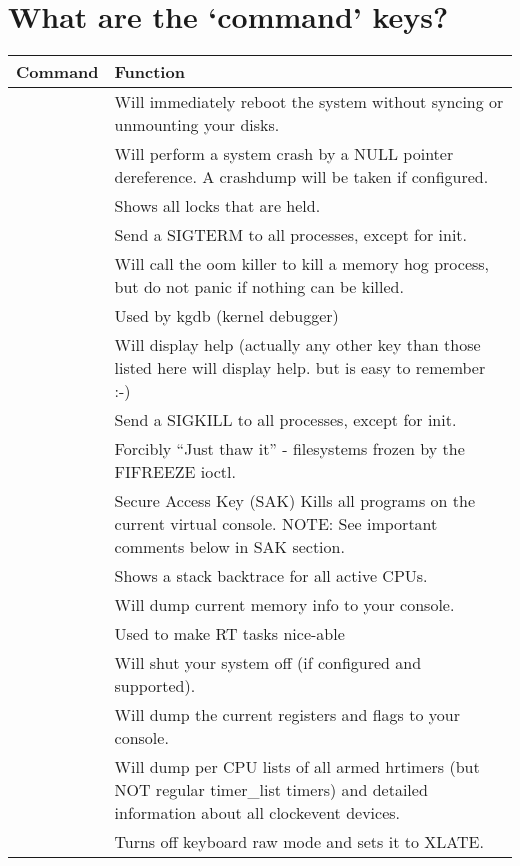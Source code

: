 \documentclass[a4paper,8pt,english]{sphinxmanual}
\begin{document}
\section{What are the `command' keys?}
\label{admin-guide/sysrq:what-are-the-command-keys}
\begin{tabulary}{\linewidth}{|L|L|}
\hline
\textsf{\relax 
Command
} & \textsf{\relax 
Function
}\\
\hline
{}
 & 
Will immediately reboot the system without syncing or unmounting
your disks.
\\
\hline
{}
 & 
Will perform a system crash by a NULL pointer dereference.
A crashdump will be taken if configured.
\\
\hline
{}
 & 
Shows all locks that are held.
\\
\hline
{}
 & 
Send a SIGTERM to all processes, except for init.
\\
\hline
{}
 & 
Will call the oom killer to kill a memory hog process, but do not
panic if nothing can be killed.
\\
\hline
{}
 & 
Used by kgdb (kernel debugger)
\\
\hline
{}
 & 
Will display help (actually any other key than those listed
here will display help. but  is easy to remember :-)
\\
\hline
{}
 & 
Send a SIGKILL to all processes, except for init.
\\
\hline
{}
 & 
Forcibly ``Just thaw it'' - filesystems frozen by the FIFREEZE ioctl.
\\
\hline
{}
 & 
Secure Access Key (SAK) Kills all programs on the current virtual
console. NOTE: See important comments below in SAK section.
\\
\hline
{}
 & 
Shows a stack backtrace for all active CPUs.
\\
\hline
{}
 & 
Will dump current memory info to your console.
\\
\hline
{}
 & 
Used to make RT tasks nice-able
\\
\hline
{}
 & 
Will shut your system off (if configured and supported).
\\
\hline
{}
 & 
Will dump the current registers and flags to your console.
\\
\hline
{}
 & 
Will dump per CPU lists of all armed hrtimers (but NOT regular
timer\_list timers) and detailed information about all
clockevent devices.
\\
\hline
{}
 & 
Turns off keyboard raw mode and sets it to XLATE.

\end{tabulary}
\end{document}
